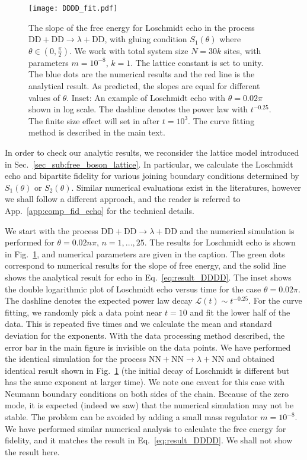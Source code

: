 \begin{figure}[h]
\texttt{[image: DDDD\_fit.pdf]}
\caption{The slope of the free energy for Loschmidt echo in the process $\text{DD}+\text{DD}\rightarrow\lambda+\text{DD}$, with gluing condition $S_1(\theta)$ where $\theta\in(0,\frac{\pi}{2})$. We work with total system size $N=30k$ sites, with parameters $m=10^{-8}$, $k=1$. The lattice constant is set to unity. The blue dots are the numerical results and the red line is the analytical result. As predicted, the slopes are equal for different values of $\theta$. Inset: An example of Loschmidt echo with $\theta=0.02\pi$ shown in log scale. The dashline denotes the power law with $t^{-0.25}$. The finite size effect will set in after $t=10^{3}$. The curve fitting method is described in the main text.}
\label{fig:DDDD}
\end{figure}

In order to check our analytic results, we reconsider the lattice model introduced in Sec.~\ref{sec_sub:free_boson_lattice}. In particular, we calculate the Loschmidt echo and bipartite fidelity for various joining boundary conditions determined by $S_1(\theta)$ or $S_2(\theta)$. Similar numerical evaluations exist in the literatures\cite{vasseur_universal_2014,stephan_local_2011},  however we shall follow a different approach, and the reader is referred to App.~\ref{app:comp_fid_echo} for the technical details. 

We start with the process $\text{DD}+\text{DD}\rightarrow\lambda+\text{DD}$ and the numerical simulation is performed for $\theta=0.02n\pi$, $n=1,...,25$. The results for Loschmidt echo is shown in Fig.~\ref{fig:DDDD}, and numerical parameters are given in the caption. The green dots correspond to numerical results for the slope of free energy, and the solid line shows the analytical result for echo in Eq.~\eqref{eq:result_DDDD}. The inset shows the double logarithmic plot of Loschmidt echo versus time for the case $\theta=0.02\pi$. The dashline denotes the expected power law decay $\mathcal{L}(t)\sim t^{-0.25}$. For the curve fitting, we randomly pick a data point near $t=10$ and fit the lower half of the data. This is repeated five times and we calculate the mean and standard deviation for the exponents. With the data processing method described, the error bar in the main figure is invisible on the data points. We have performed the identical simulation for the process $\text{NN}+\text{NN}\rightarrow\lambda+\text{NN}$ and obtained identical result shown in Fig.~\ref{fig:DDDD} (the initial decay of Loschmidt is different but has the same exponent at larger time). We note one caveat for this case with Neumann boundary conditions on both sides of the chain. Because of the zero mode, it is expected (indeed we saw) that the numerical simulation may not be stable. The problem can be avoided by adding a small mass regulator $m=10^{-8}$. We have performed similar numerical analysis to calculate the free energy for fidelity, and it matches the result in Eq.~\eqref{eq:result_DDDD}. We shall not show the result here. 

